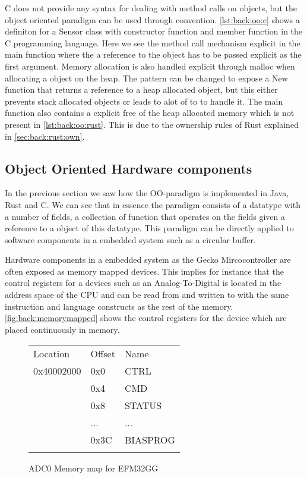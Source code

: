 C does not provide any syntax for dealing with method calls on objects, but the object oriented paradigm can be used through convention.
\autoref{lst:back:oo:c} shows a definiton for a Sensor class with constructor function and member function in the C programming language.
Here we see the method call mechanism explicit in the main function where the a reference to the object has to be passed explicit as the first argument.
Memory allocation is also handled explicit through malloc when allocating a object on the heap.
The pattern can be changed to expose a New function that returns a reference to a heap allocated object, but this either prevents stack allocated objects or leads to alot of to to handle it.
The main function also contains a explicit free of the heap allocated memory which is not present in \autoref{lst:back:oo:rust}.
This is due to the ownership rules of Rust explained in \autoref{sec:back:rust:own}.

\subsection{Object Oriented Hardware components}

In the previous section we saw how the OO-paradigm is implemented in Java, Rust and C.
We can see that in essence the paradigm consists of a datatype with a number of fields, a collection of function that operates on the fields given a reference to a object of this datatype.
This paradigm can be directly applied to software components in a embedded system such as a circular buffer.

Hardware components in a embedded system as the Gecko Mircocontroller are often exposed as memory mapped devices.
This implies for instance that the control registers for a devices such as an Analog-To-Digital is located in the address space of the CPU and can be read from and written to with the same instruction and language constructs as the rest of the memory.
\autoref{fig:back:memorymapped} shows the control registers for the device which are placed continuously in memory.

\begin{figure}[H]
  \centering
  \begin{tabular}{l|l|l|}
    &&\\
    \hline
    Location&Offset&Name\\
    \hline
    0x40002000&0x0&CTRL\\
    \hline
    &0x4&CMD\\
    \hline
    &0x8&STATUS\\
    \hline
    &...&... \\
    \hline
    &0x3C&BIASPROG\\
    \hline
    &&\\

  \end{tabular}
  \caption{ADC0 Memory map for EFM32GG}
  \label{tab:back:memorymapped}
\end{figure}

